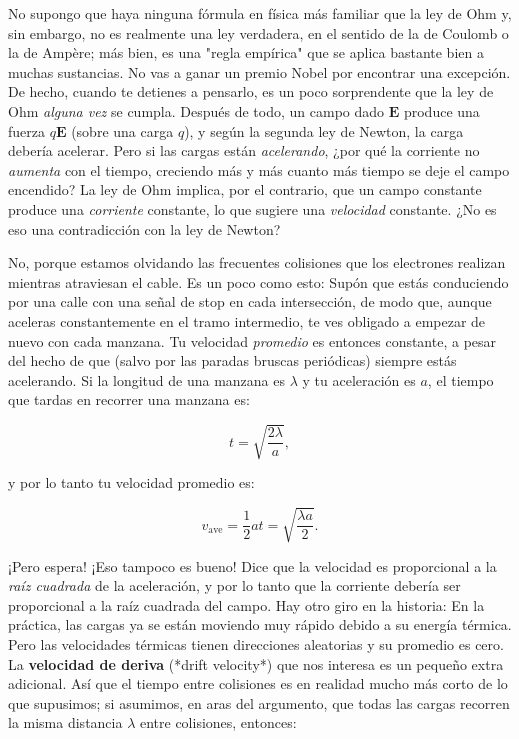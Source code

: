 \documentclass[12pt,a4paper]{report}
\newcommand{\esp}{\vspace{0.5cm}}
\begin{document}
	No supongo que haya ninguna fórmula en física más familiar que la ley de Ohm y, sin embargo, no es realmente una ley verdadera, en el sentido de la de Coulomb o la de Ampère; más bien, es una "regla empírica" que se aplica bastante bien a muchas sustancias. No vas a ganar un premio Nobel por encontrar una excepción. De hecho, cuando te detienes a pensarlo, es un poco sorprendente que la ley de Ohm \textit{alguna vez} se cumpla. Después de todo, un campo dado $\mathbf{E}$ produce una fuerza $q\mathbf{E}$ (sobre una carga $q$), y según la segunda ley de Newton, la carga debería acelerar. Pero si las cargas están \textit{acelerando}, ¿por qué la corriente no \textit{aumenta} con el tiempo, creciendo más y más cuanto más tiempo se deje el campo encendido? La ley de Ohm implica, por el contrario, que un campo constante produce una \textit{corriente} constante, lo que sugiere una \textit{velocidad} constante. ¿No es eso una contradicción con la ley de Newton?
	
	\esp
	
	No, porque estamos olvidando las frecuentes colisiones que los electrones realizan mientras atraviesan el cable. Es un poco como esto: Supón que estás conduciendo por una calle con una señal de stop en cada intersección, de modo que, aunque aceleras constantemente en el tramo intermedio, te ves obligado a empezar de nuevo con cada manzana. Tu velocidad \textit{promedio} es entonces constante, a pesar del hecho de que (salvo por las paradas bruscas periódicas) siempre estás acelerando. Si la longitud de una manzana es $\lambda$ y tu aceleración es $a$, el tiempo que tardas en recorrer una manzana es:
	
	\esp
	
	\begin{equation}
		t = \sqrt{\frac{2\lambda}{a}},
	\end{equation}
	
	\esp
	
	y por lo tanto tu velocidad promedio es:
	
	\esp
	
	\begin{equation}
		v_{\text{ave}} = \frac{1}{2} at = \sqrt{\frac{\lambda a}{2}}.
	\end{equation}
	
	\esp
	
	¡Pero espera! ¡Eso tampoco es bueno! Dice que la velocidad es proporcional a la \textit{raíz cuadrada} de la aceleración, y por lo tanto que la corriente debería ser proporcional a la raíz cuadrada del campo. Hay otro giro en la historia: En la práctica, las cargas ya se están moviendo muy rápido debido a su energía térmica. Pero las velocidades térmicas tienen direcciones aleatorias y su promedio es cero. La \textbf{velocidad de deriva} (*drift velocity*) que nos interesa es un pequeño extra adicional. Así que el tiempo entre colisiones es en realidad mucho más corto de lo que supusimos; si asumimos, en aras del argumento, que todas las cargas recorren la misma distancia $\lambda$ entre colisiones, entonces:
	
\end{document}
